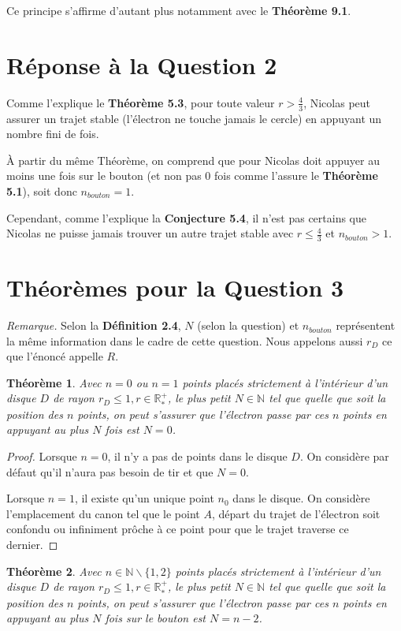 \documentclass{amsart}
\newtheorem{theorem}{Théorème}[section]
\theoremstyle{definition}
\theoremstyle{remark}
\numberwithin{equation}{section}
\begin{document}
Ce principe s'affirme d'autant plus notamment avec le \textbf{Théorème 9.1}.

\section{Réponse à la Question 2}

Comme l'explique le \textbf{Théorème 5.3}, pour toute valeur $r>\frac{4}{3}$, Nicolas peut assurer un trajet stable (l'électron ne touche jamais le cercle) en appuyant un nombre fini de fois.

À partir du même Théorème, on comprend que pour Nicolas doit appuyer au moins une fois sur le bouton (et non pas 0 fois comme l'assure le \textbf{Théorème 5.1}), soit donc $n_{bouton}=1$.

Cependant, comme l'explique la \textbf{Conjecture 5.4}, il n'est pas certains que Nicolas ne puisse jamais trouver un autre trajet stable avec $r\leq\frac{4}{3}$ et $n_{bouton}>1$.

\section{Théorèmes pour la Question 3}

\textit{Remarque.} Selon la \textbf{Définition 2.4}, $N$ (selon la question) et $n_{bouton}$ représentent la même information dans le cadre de cette question. Nous appelons aussi $r_D$ ce que l'énoncé appelle $R$.
\begin{theorem}
  Avec $n=0 $ ou $n=1$ points placés strictement à l'intérieur d'un disque $D$ de rayon $r_D\leq1,r\in\mathbb{R^+_*}$, le plus petit $N\in\mathbb{N}$ tel que quelle que soit la
  position des $n$ points, on peut s’assurer que l’électron passe par ces $n$ points en appuyant au plus $N$ fois est $N=0$.
\end{theorem}

\begin{proof}
  Lorsque $n=0$, il n'y a pas de points dans le disque $D$. On considère par défaut qu'il n'aura pas besoin de tir et que $N=0$.

  Lorsque $n=1$, il existe qu'un unique point $n_0$ dans le disque. On considère l'emplacement du canon tel que le point $A$, départ du trajet de l'électron soit confondu ou infiniment prôche à ce point pour que le trajet traverse ce dernier.
\end{proof}

\begin{theorem}
  Avec $n\in\mathbb{N}\backslash\lbrace{1,2}\rbrace$ points placés strictement à l'intérieur d'un disque $D$ de rayon $r_D\leq1, r\in\mathbb{R^+_*}$, le plus petit $N\in\mathbb{N}$ tel que quelle que soit la
  position des $n$ points, on peut s’assurer que l’électron passe par ces $n$ points en appuyant au plus $N$ fois sur le bouton est $N=n-2$.
\end{theorem}
\end{document}
